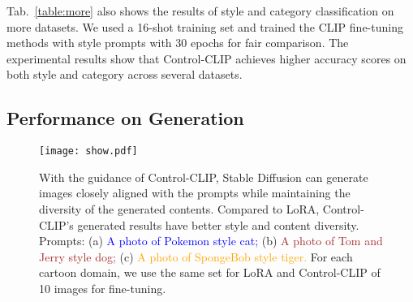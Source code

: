 Tab.~\ref{table:more} also shows the results of style and category classification on more datasets. We used a 16-shot training set and trained the CLIP fine-tuning methods with style prompts with 30 epochs for fair comparison. The experimental results show that Control-CLIP achieves higher accuracy scores on both style and category across several datasets.

\begin{table}[]
\caption{Recognition accuracy with varying residual ratio $\alpha$.}
\label{table:alpha}
\end{table}


\subsection{Performance on Generation}

\begin{figure*}[t]
\begin{center}
\texttt{[image: show.pdf]}
\end{center}
   \caption{With the guidance of Control-CLIP, Stable Diffusion can generate images closely aligned with the prompts while maintaining the diversity of the generated contents. Compared to LoRA, Control-CLIP's generated results have better style and content diversity. Prompts: (a) \textcolor{blue}{A photo of Pokemon style cat;} (b) \textcolor{brown}{A photo of Tom and Jerry style dog;} (c) \textcolor{orange}{A photo of SpongeBob style tiger.} For each cartoon domain, we use the same set for LoRA and Control-CLIP of 10 images for fine-tuning.}
\label{fig:show}
\end{figure*}

